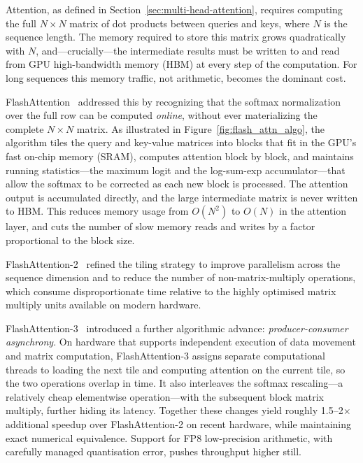 \documentclass{book}
\begin{document}
Attention, as defined in Section~\ref{sec:multi-head-attention}, requires computing the
full $N \times N$ matrix of dot products between queries and keys, where $N$
is the sequence length. The memory required to store this matrix grows
quadratically with $N$, and---crucially---the intermediate results must be
written to and read from GPU high-bandwidth memory (HBM) at every step of the
computation. For long sequences this memory traffic, not arithmetic, becomes
the dominant cost.

FlashAttention~\cite{dao2022flashattention} addressed this by recognizing that
the softmax normalization over the full row can be computed \emph{online},
without ever materializing the complete $N \times N$ matrix. As illustrated in
Figure~\ref{fig:flash_attn_algo}, the algorithm tiles the query and key-value
matrices into blocks that fit in the GPU's fast on-chip memory (SRAM),
computes attention block by block, and maintains running
statistics---the maximum logit and the log-sum-exp accumulator---that allow
the softmax to be corrected as each new block is processed. The attention
output is accumulated directly, and the large intermediate matrix is never
written to HBM. This reduces memory usage from $O(N^2)$ to $O(N)$ in the
attention layer, and cuts the number of slow memory reads and writes by a
factor proportional to the block size.

FlashAttention-2~\cite{dao2023flashattention2} refined the tiling strategy to
improve parallelism across the sequence dimension and to reduce the number of
non-matrix-multiply operations, which consume disproportionate time relative
to the highly optimised matrix multiply units available on modern hardware.

FlashAttention-3~\cite{shah2024flashattention3} introduced a further
algorithmic advance: \emph{producer-consumer asynchrony}. On hardware that
supports independent execution of data movement and matrix computation,
FlashAttention-3 assigns separate computational threads to loading the next
tile and computing attention on the current tile, so the two operations
overlap in time. It also interleaves the softmax rescaling---a relatively
cheap elementwise operation---with the subsequent block matrix multiply,
further hiding its latency. Together these changes yield roughly 1.5--2$\times$
additional speedup over FlashAttention-2 on recent hardware, while maintaining
exact numerical equivalence. Support for FP8 low-precision arithmetic, with
carefully managed quantisation error, pushes throughput higher still.
\end{document}
